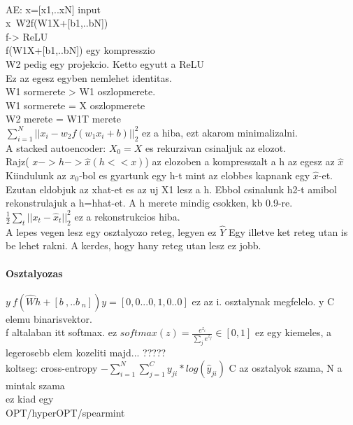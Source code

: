 \documentclass[10pt,a4paper]{report}
\begin{document}
\paragraph{}
AE: x=[x1,..xN] input\\
x~W2f(W1X+[b1,..bN])\\
f-> ReLU\\
f(W1X+[b1,..bN]) egy kompresszio\\
W2 pedig egy projekcio. Ketto egyutt a ReLU\\
Ez az egesz egyben nemlehet identitas.\\
W1 sormerete > W1 oszlopmerete.\\
W1 sormerete = X oszlopmerete\\
W2 merete = W1T merete\\
$\sum_{i=1}^N||x_i-w_2f(w_1x_i+b)||_2^2$ ez a hiba, ezt akarom minimalizalni.\\
A stacked autoencoder: $X_0 = X$ es rekurzivan csinaljuk az elozot.\\
Rajz( $x->h->\hat{x} (h << x)$) az elozoben a kompresszalt a h az egesz az $\hat{x}$\\
Kiindulunk az $x_0$-bol es gyartunk egy h-t mint az elobbes kapnank egy $\hat{x}$-et.\\
Ezutan eldobjuk az xhat-et es az uj X1 lesz a h. Ebbol csinalunk h2-t amibol rekonstrulajuk a h=hhat-et. A h merete mindig csokken, kb 0.9-re.\\
$\frac{1}{2}\sum_t||x_t - \hat{x}_t||_2^2$ ez a rekonstrukcios hiba.
\\
A lepes vegen lesz egy osztalyozo reteg, legyen ez $\hat{Y}$ Egy illetve ket reteg utan is be lehet rakni. A kerdes, hogy hany reteg utan lesz ez jobb.\\

\paragraph{Osztalyozas}
$y~f(\hat{W}h+[b~,..b~_n]) y = [0,0...0,1,0..0]$  ez az i. osztalynak megfelelo. y C elemu binarisvektor.\\
f altalaban itt softmax. ez $softmax(z) = \frac{e^{z_i}}{\sum_j e^{z_j}}\in [0,1]$
ez egy kiemeles, a legerosebb elem kozeliti majd... ?????\\
koltseg: cross-entropy $ -\sum_{i=1}^N\sum_{j=1}^C y_{ji}*log(\hat{y}_{ji})$  C az osztalyok szama, N a mintak szama\\
ez kiad egy\\
OPT/hyperOPT/spearmint\\
\end{document}

